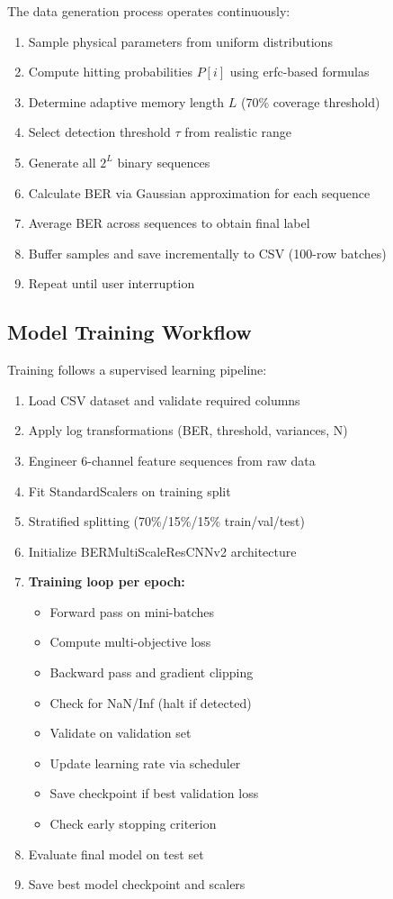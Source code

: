 \documentclass[a4paper,12pt]{report}
\begin{document}
The data generation process operates continuously:
\begin{enumerate}
    \item Sample physical parameters from uniform distributions
    \item Compute hitting probabilities $P[i]$ using erfc-based formulas
    \item Determine adaptive memory length $L$ (70\% coverage threshold)
    \item Select detection threshold $\tau$ from realistic range
    \item Generate all $2^L$ binary sequences
    \item Calculate BER via Gaussian approximation for each sequence
    \item Average BER across sequences to obtain final label
    \item Buffer samples and save incrementally to CSV (100-row batches)
    \item Repeat until user interruption
\end{enumerate}

\subsection{Model Training Workflow}

Training follows a supervised learning pipeline:
\begin{enumerate}
    \item Load CSV dataset and validate required columns
    \item Apply log transformations (BER, threshold, variances, N)
    \item Engineer 6-channel feature sequences from raw data
    \item Fit StandardScalers on training split
    \item Stratified splitting (70\%/15\%/15\% train/val/test)
    \item Initialize BERMultiScaleResCNNv2 architecture
    \item \textbf{Training loop per epoch:}
    \begin{itemize}
        \item Forward pass on mini-batches
        \item Compute multi-objective loss
        \item Backward pass and gradient clipping
        \item Check for NaN/Inf (halt if detected)
        \item Validate on validation set
        \item Update learning rate via scheduler
        \item Save checkpoint if best validation loss
        \item Check early stopping criterion
    \end{itemize}
    \item Evaluate final model on test set
    \item Save best model checkpoint and scalers
\end{enumerate}
\end{document}
